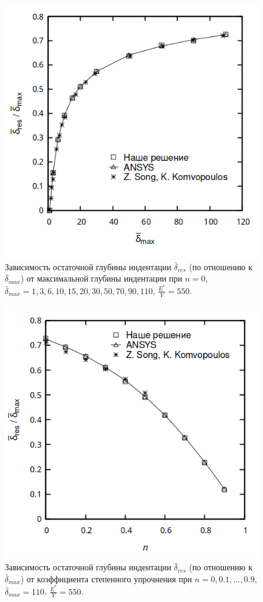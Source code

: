 \documentclass[]{article}
\begin{document}
\begin{figure}[h!]
	\centering
	\includegraphics[height=0.25\textheight]{pictures/bd_residual_bd_max.png}
	\caption{Зависимость остаточной глубины индентации $\bar{\delta}_{res}$ (по отношению к $\bar{\delta}_{max}$) от максимальной глубины индентации при ${n=0}$, ${\bar{\delta}_{max}=1,3,6,10,15,20,30,50,70,90,110}$, ${\frac{E^*}{Y}=550}$.
	}
	\label{fig:res2}
\end{figure}
\begin{figure}[h!]
	\centering
	\includegraphics[height=0.25\textheight]{pictures/bd_residual_n.png}
	\caption{ Зависимость остаточной глубины индентации $\bar{\delta}_{res}$ (по отношению к $\bar{\delta}_{max}$) от коэффициента степенного упрочнения при ${n=0, 0.1, ..., 0.9}$, ${\bar{\delta}_{max}=110}$, ${\frac{E^*}{Y}=550}$.
	}
	\label{fig:res3}
\end{figure}
\end{document}
